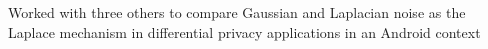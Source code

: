 \documentclass[letterpaper]{resume}
\begin{document}
\begin{compactitem}
\item Worked with three others to compare Gaussian and Laplacian noise as the Laplace mechanism in differential privacy applications in an Android context
\end{compactitem}


% 
\end{document}
